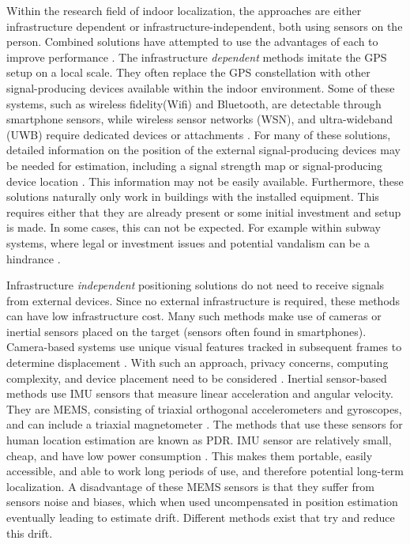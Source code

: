 Within the research field of indoor localization, the approaches are either infrastructure dependent or infrastructure-independent, both using sensors on the person. Combined solutions have attempted to use the advantages of each to improve performance \cite{Gu2019, Correa2017}. The infrastructure \textit{dependent} methods imitate the GPS setup on a local scale. They often replace the GPS constellation with other signal-producing devices available within the indoor environment. Some of these systems, such as wireless fidelity(Wifi) and Bluetooth, are detectable through smartphone sensors, while wireless sensor networks (WSN), and ultra-wideband (UWB) require dedicated devices or attachments \cite{Wu2019,Jackermeier2018,Davidson2017}. For many of these solutions, detailed information on the position of the external signal-producing devices may be needed for estimation, including a signal strength map or signal-producing device location \cite{Jackermeier2018,Shang2015}. This information may not be easily available. Furthermore, these solutions naturally only work in buildings with the installed equipment. This requires either that they are already present or some initial investment and setup is made. In some cases, this can not be expected. For example within subway systems, where legal or investment issues and potential vandalism can be a hindrance \cite{Torok2014}. \par
%

Infrastructure \textit{independent} positioning solutions do not need to receive signals from external devices. Since no external infrastructure is required, these methods can have low infrastructure cost. Many such methods make use of cameras or inertial sensors placed on the target (sensors often found in smartphones). Camera-based systems use unique visual features tracked in subsequent frames to determine displacement \cite{Gu2019}. With such an approach, privacy concerns, computing complexity, and device placement need to be considered \cite{Gu2019}. Inertial sensor-based methods use \ac{IMU} sensors that measure linear acceleration and angular velocity. They are \ac{MEMS},  consisting of triaxial orthogonal accelerometers and gyroscopes, and can include a triaxial magnetometer \cite{Yang2014}. The methods that use these sensors for human location estimation are known as \ac{PDR}. \ac{IMU} sensor are relatively small, cheap, and have low power consumption \cite{Olsson2016}. This makes them portable, easily accessible, and able to work long periods of use, and therefore potential long-term localization. A disadvantage of these \ac{MEMS} sensors is that they suffer from sensors noise and biases, which when used uncompensated in position estimation eventually leading to estimate drift. Different methods exist that try and reduce this drift. \par

